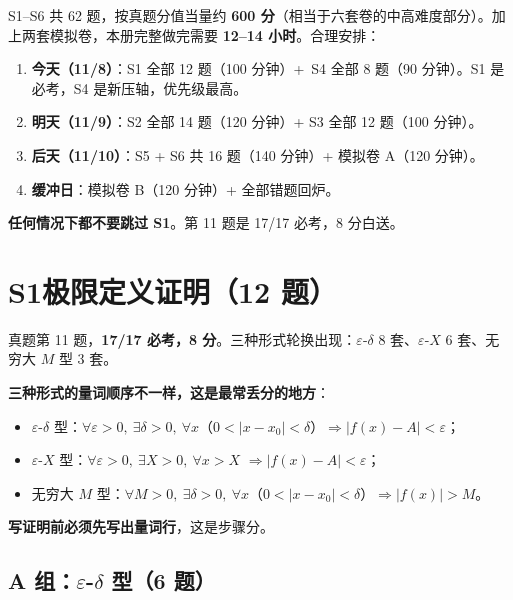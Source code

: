 \documentclass[11pt,a4paper]{ctexart}
\newcommand{\eps}{\varepsilon}
\begin{document}
\begin{warnbox}[时间预算]
S1--S6 共 62 题，按真题分值当量约 \textbf{600 分}（相当于六套卷的中高难度部分）。加上两套模拟卷，本册完整做完需要 \textbf{12--14 小时}。合理安排：

\begin{enumerate}
\item \textbf{今天（11/8）}：S1 全部 12 题（100 分钟）+\ S4 全部 8 题（90 分钟）。S1 是必考，S4 是新压轴，优先级最高。
\item \textbf{明天（11/9）}：S2 全部 14 题（120 分钟）+ S3 全部 12 题（100 分钟）。
\item \textbf{后天（11/10）}：S5 + S6 共 16 题（140 分钟）+ 模拟卷 A（120 分钟）。
\item \textbf{缓冲日}：模拟卷 B（120 分钟）+ 全部错题回炉。
\end{enumerate}
\textbf{任何情况下都不要跳过 S1}。第 11 题是 17/17 必考，8 分白送。
\end{warnbox}

\section{S1\quad 极限定义证明（12 题）}

\begin{methodbox}[这一组考什么]
真题第 11 题，\textbf{17/17 必考，8 分}。三种形式轮换出现：$\eps$-$\delta$ 8 套、$\eps$-$X$ 6 套、无穷大 $M$ 型 3 套。

\textbf{三种形式的量词顺序不一样，这是最常丢分的地方}：
\begin{itemize}
\item $\eps$-$\delta$ 型：$\forall\eps>0,\ \exists\delta>0,\ \forall x$（$0<|x-x_0|<\delta$）$\Rightarrow |f(x)-A|<\eps$；
\item $\eps$-$X$ 型：$\forall\eps>0,\ \exists X>0,\ \forall x>X$ $\Rightarrow |f(x)-A|<\eps$；
\item 无穷大 $M$ 型：$\forall M>0,\ \exists\delta>0,\ \forall x$（$0<|x-x_0|<\delta$）$\Rightarrow |f(x)|>M$。
\end{itemize}
\textbf{写证明前必须先写出量词行}，这是步骤分。
\end{methodbox}

\subsection{A 组：\texorpdfstring{$\eps$-$\delta$ 型}{eps-delta 型}（6 题）}
\end{document}
